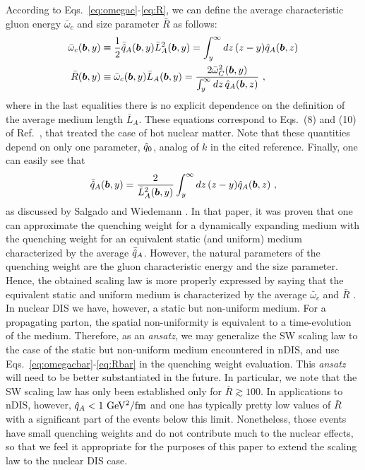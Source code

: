 According to Eqs.~\eqref{eq:omegac}-\eqref{eq:R}, we can define the average 
characteristic gluon energy $\bar\omega_c$ and size parameter $\bar R$ as 
follows:
\begin{align}
  \bar\omega_c(\vec b,y)& \equiv \frac{1}{2} \bar\qhat_A(\vec b,y) 
    \bar L_A^2(\vec b,y) 
    = \int_y^\infty dz\, (z-y)\qhat_A(\vec b,z) 
  \label{eq:omegacbar} \\
  \bar R(\vec b,y) & \equiv \bar\omega_c(\vec b,y) \bar L_A(\vec b,y) 
    = \frac{2 \bar\omega_C^2(\vec b,y)}{\int_y^\infty dz\,
    \qhat_A(\vec b,z)} \ , 
  \label{eq:Rbar}
\end{align}
where in the last equalities there is no explicit dependence on the definition of the average medium length $\bar L_A$. These equations correspond to Eqs.~(8) and (10) of Ref.~\cite{Dainese:2004te}, that treated the case of hot nuclear matter. Note that these quantities depend on only one parameter, ${\hat q}_0$, analog of $k$ in the cited reference. Finally, one can easily see that
\begin{align}
  \bar\qhat_A(\vec b,y) = \frac{2}{\bar L_A^2(\vec b,y)} \int_y^\infty dz\,
    (z-y)\qhat_A(\vec b,z) \ ,
\end{align}
as discussed by Salgado and Wiedemann \cite{Salgado:2003gb}. In that paper, it was proven that one can approximate the quenching weight for a dynamically expanding medium with the quenching weight for an equivalent static (and uniform) medium characterized by the average $\bar{{\hat q}}_A$. However, the natural parameters of the quenching weight are the gluon characteristic energy and the size parameter. Hence, the obtained scaling law is more properly expressed by saying that the equivalent static and uniform medium is characterized by the average $\bar \omega_c$ and $\bar R$ \cite{Dainese:2004te}. In nuclear DIS we have, however, a static but non-uniform medium. For a propagating parton, the spatial non-uniformity is equivalent to a time-evolution of the medium. Therefore, as an {\it ansatz}, we may generalize the SW scaling law to the case of the static but non-uniform medium encountered in nDIS, and use Eqs.~\eqref{eq:omegacbar}-\eqref{eq:Rbar} in the quenching weight evaluation. This {\it ansatz} will need to be better substantiated in the future. In particular, we note that the SW scaling law has only been established only for $\bar R \gtrsim 100$. In applications to nDIS, however, ${\hat q}_A < 1\ \text{GeV$^2$/fm}$ and one 
has typically pretty low values of $\bar R$ with a significant part of the 
events below this limit. Nonetheless, those events have small quenching weights and do not contribute much to the nuclear effects, so that we feel it appropriate for the purposes of this paper to extend the scaling law to the nuclear DIS case.


